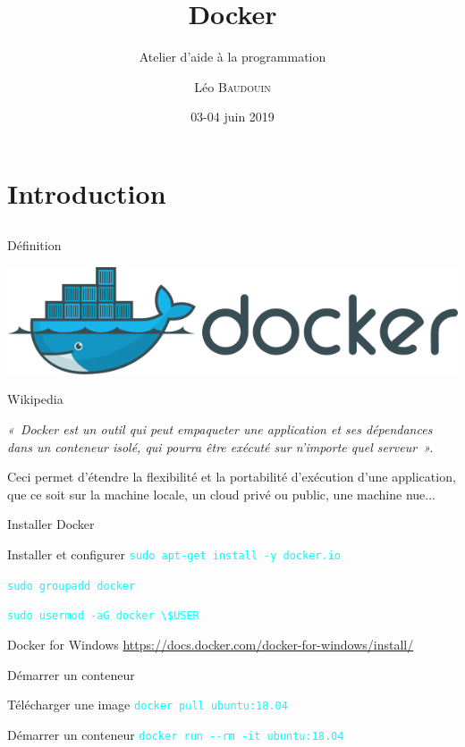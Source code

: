 \documentclass{beamer}
\title{Docker}
\subtitle{Atelier d'aide à la programmation}
\author{L\'eo \textsc{Baudouin}}
\institute{
  {\url{baudouin.leo @ gmail.com}}
}
\date{03-04 juin 2019}
\begin{document}
\begin{frame}
  \titlepage
\end{frame}

\section{Introduction}
\subsection{}

\begin{frame}{Définition}


\begin{center}
\includegraphics[width=0.5\linewidth]{images/docker-logo}
\end{center}

\begin{block}{Wikipedia}
{\it 
«~Docker est un outil qui peut empaqueter une application et ses dépendances dans un conteneur isolé, qui pourra être exécuté sur n'importe quel serveur~».

Ceci permet d'étendre la flexibilité et la portabilité d’exécution d'une application, que ce soit sur la machine locale, un cloud privé ou public, une machine nue...}
\end{block}
\end{frame}


\begin{frame}[fragile]{Installer Docker}

\begin{block}{Installer et configurer}
\textcolor{cyan}{\verb?sudo apt-get install -y docker.io?}

\textcolor{cyan}{\verb?sudo groupadd docker?}

\textcolor{cyan}{\verb?sudo usermod -aG docker \$USER?}
\end{block}

\begin{block}{Docker for Windows}
\href{https://docs.docker.com/docker-for-windows/install/}{https://docs.docker.com/docker-for-windows/install/}
\end{block}

\end{frame}


\begin{frame}{Démarrer un conteneur}

\begin{block}{Télécharger une image}
\textcolor{cyan}{\verb?docker pull ubuntu:18.04?}
\end{block}

\begin{block}{Démarrer un conteneur}
\textcolor{cyan}{\verb?docker run --rm -it ubuntu:18.04?}
\end{block}

\end{frame}
\end{document}
